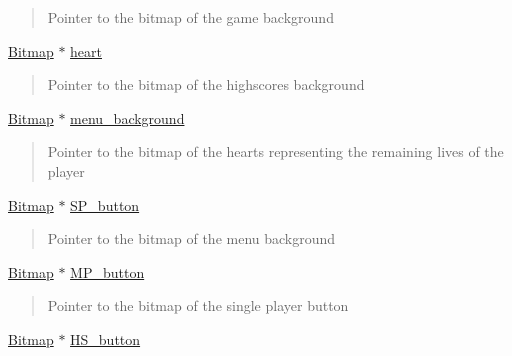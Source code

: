 \begin{DoxyCompactItemize}
\begin{DoxyCompactList}\small\item\em \begin{quote}
Pointer to the bitmap of the game background \end{quote}
\end{DoxyCompactList}\item 
\hyperlink{struct_bitmap}{Bitmap} $\ast$ \hyperlink{struct_b_m_ps_holder__t_a20a8f018e047cf6d61906b9d11b0a622}{heart}
\begin{DoxyCompactList}\small\item\em \begin{quote}
Pointer to the bitmap of the highscores background \end{quote}
\end{DoxyCompactList}\item 
\hyperlink{struct_bitmap}{Bitmap} $\ast$ \hyperlink{struct_b_m_ps_holder__t_ac193d2d14607ee64994b4385d21808b3}{menu\+\_\+background}
\begin{DoxyCompactList}\small\item\em \begin{quote}
Pointer to the bitmap of the hearts representing the remaining lives of the player \end{quote}
\end{DoxyCompactList}\item 
\hyperlink{struct_bitmap}{Bitmap} $\ast$ \hyperlink{struct_b_m_ps_holder__t_a7f5933cadc7f54074b09ce901893a609}{S\+P\+\_\+button}
\begin{DoxyCompactList}\small\item\em \begin{quote}
Pointer to the bitmap of the menu background \end{quote}
\end{DoxyCompactList}\item 
\hyperlink{struct_bitmap}{Bitmap} $\ast$ \hyperlink{struct_b_m_ps_holder__t_a4c46a999d7b9f15c2ecc0ad5b3b69163}{M\+P\+\_\+button}
\begin{DoxyCompactList}\small\item\em \begin{quote}
Pointer to the bitmap of the single player button \end{quote}
\end{DoxyCompactList}\item 
\hyperlink{struct_bitmap}{Bitmap} $\ast$ \hyperlink{struct_b_m_ps_holder__t_af7900570e309f23ad946097469181db9}{H\+S\+\_\+button}
\begin{DoxyCompactList}\small\item\em \begin{quote}

\end{quote}
\end{DoxyCompactList}
\end{DoxyCompactItemize}
